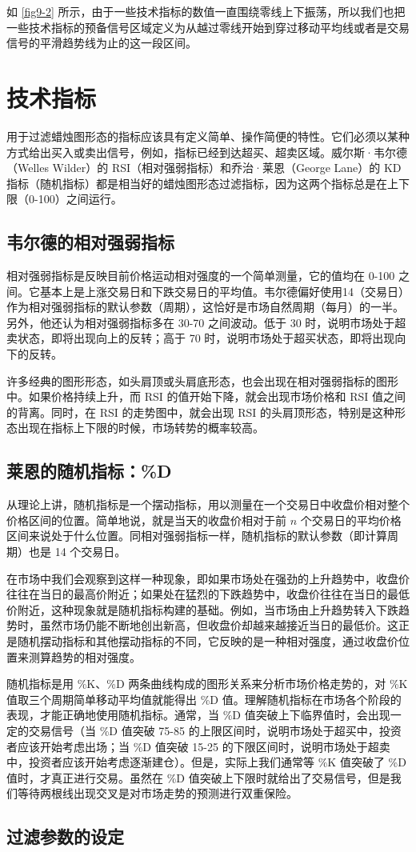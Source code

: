 
如 \autoref{fig9-2} 所示，由于一些技术指标的数值一直围绕零线上下振荡，所以我们也把一些技术指标的预备信号区域定义为从越过零线开始到穿过移动平均线或者是交易信号的平滑趋势线为止的这一段区间。

\section{技术指标}
用于过滤蜡烛图形态的指标应该具有定义简单、操作简便的特性。它们必须以某种方式给出买入或卖出信号，例如，指标已经到达超买、超卖区域。威尔斯·韦尔德（Welles Wilder）的 RSI（相对强弱指标）和乔治·莱恩（George Lane）的 KD 指标（随机指标）都是相当好的蜡烛图形态过滤指标，因为这两个指标总是在上下限（0-100）之间运行。
\subsection{韦尔德的相对强弱指标}
相对强弱指标是反映目前价格运动相对强度的一个简单测量，它的值均在 0-100 之间。它基本上是上涨交易日和下跌交易日的平均值。韦尔德偏好使用14（交易日）作为相对强弱指标的默认参数（周期），这恰好是市场自然周期（每月）的一半。另外，他还认为相对强弱指标多在 30-70 之间波动。低于 30 时，说明市场处于超卖状态，即将出现向上的反转；高于 70 时，说明市场处于超买状态，即将出现向下的反转。

许多经典的图形形态，如头肩顶或头肩底形态，也会出现在相对强弱指标的图形中。如果价格持续上升，而 RSI 的值开始下降，就会出现市场价格和 RSI 值之间的背离。同时，在 RSI 的走势图中，就会出现 RSI 的头肩顶形态，特别是这种形态出现在指标上下限的时候，市场转势的概率较高。
\subsection{莱恩的随机指标：\%D}
从理论上讲，随机指标是一个摆动指标，用以测量在一个交易日中收盘价相对整个价格区间的位置。简单地说，就是当天的收盘价相对于前 $n$ 个交易日的平均价格区间来说处于什么位置。同相对强弱指标一样，随机指标的默认参数（即计算周期）也是 14 个交易日。

在市场中我们会观察到这样一种现象，即如果市场处在强劲的上升趋势中，收盘价往往在当日的最高价附近；如果处在猛烈的下跌趋势中，收盘价往往在当日的最低价附近，这种现象就是随机指标构建的基础。例如，当市场由上升趋势转入下跌趋势时，虽然市场仍能不断地创出新高，但收盘价却越来越接近当日的最低价。这正是随机摆动指标和其他摆动指标的不同，它反映的是一种相对强度，通过收盘价位置来测算趋势的相对强度。

随机指标是用 \%K、\%D 两条曲线构成的图形关系来分析市场价格走势的，对 \%K 值取三个周期简单移动平均值就能得出 \%D 值。理解随机指标在市场各个阶段的表现，才能正确地使用随机指标。通常，当 \%D 值突破上下临界值时，会出现一定的交易信号（当 \%D 值突破 75-85 的上限区间时，说明市场处于超买中，投资者应该开始考虑出场；当 \%D 值突破 15-25 的下限区间时，说明市场处于超卖中，投资者应该开始考虑逐渐建仓）。但是，实际上我们通常等 \%K 值突破了 \%D 值时，才真正进行交易。虽然在 \%D 值突破上下限时就给出了交易信号，但是我们等待两根线出现交叉是对市场走势的预测进行双重保险。
\subsection{过滤参数的设定}